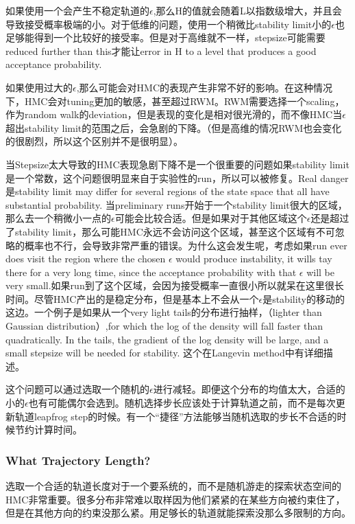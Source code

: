 \documentclass[
]{book}
\theoremstyle{definition}
\theoremstyle{definition}
\theoremstyle{definition}
\theoremstyle{remark}
\begin{document}
如果使用一个会产生不稳定轨道的\(\epsilon\),那么H的值就会随着L以指数级增大，并且会导致接受概率极端的小。对于低维的问题，使用一个稍微比stability limit小的\(\epsilon\)也足够能得到一个比较好的接受率。但是对于高维就不一样，stepsize可能需要reduced further than this才能让error in H to a level that produces a good acceptance probability.

如果使用过大的\(\epsilon\),那么可能会对HMC的表现产生非常不好的影响。在这种情况下，HMC会对tuning更加的敏感，甚至超过RWM。RWM需要选择一个scaling，作为random walk的deviation，但是表现的变化是相对很光滑的，而不像HMC当\(\epsilon\)超出stability limit的范围之后，会急剧的下降。（但是高维的情况RWM也会变化的很剧烈，所以这个区别并不是很明显）。

当Stepsize太大导致的HMC表现急剧下降不是一个很重要的问题如果stability limit是一个常数，这个问题很明显来自于实验性的run，所以可以被修复。Real danger是stability limit may differ for several regions of the state space that all have substantial probability. 当preliminary runs开始于一个stability limit很大的区域，那么去一个稍微小一点的\(\epsilon\)可能会比较合适。但是如果对于其他区域这个\(\epsilon\)还是超过了stability limit，那么可能HMC永远不会访问这个区域，甚至这个区域有不可忽略的概率也不行，会导致非常严重的错误。为什么这会发生呢，考虑如果run ever does visit the region where the chosen \(\epsilon\) would produce instability, it wills tay there for a very long time, since the acceptance probability with that \(\epsilon\) will be very small.如果run到了这个区域，会因为接受概率一直很小所以就呆在这里很长时间。尽管HMC产出的是稳定分布，但是基本上不会从一个\(\epsilon\)是stability的移动的这边。一个例子是如果从一个very light tails的分布进行抽样，（lighter than Gaussian distribution）,for which the log of the density will fall faster than quadratically. In the tails, the gradient of the log density will be large, and a small stepsize will be needed for stability. 这个在Langevin method中有详细描述。

这个问题可以通过选取一个随机的\(\epsilon\)进行减轻。即便这个分布的均值太大，合适的小的\(\epsilon\)也有可能偶尔会选到。随机选择步长应该处于计算轨道之前，而不是每次更新轨道leapfrog step的时候。有一个``捷径''方法能够当随机选取的步长不合适的时候节约计算时间。

\hypertarget{what-trajectory-length}{%
\subsubsection{What Trajectory Length?}\label{what-trajectory-length}}

选取一个合适的轨道长度对于一个要系统的，而不是随机游走的探索状态空间的HMC非常重要。很多分布非常难以取样因为他们紧紧的在某些方向被约束住了，但是在其他方向的约束没那么紧。用足够长的轨道就能探索没那么多限制的方向。
\end{document}
